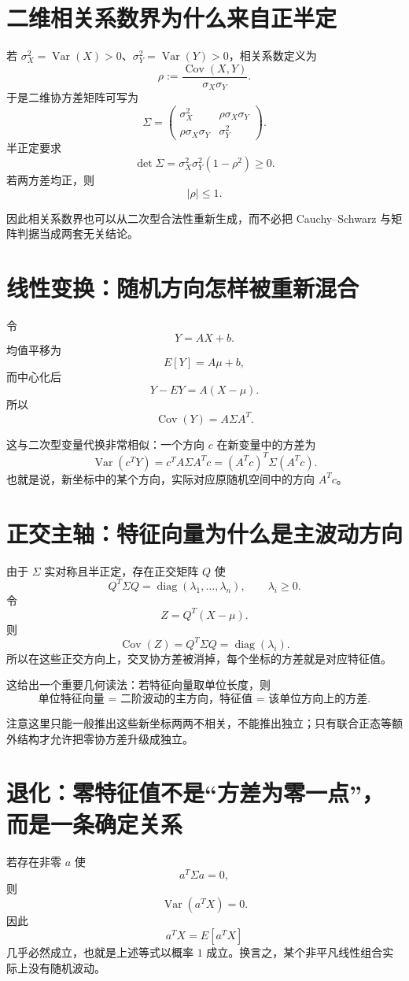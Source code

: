 \documentclass[profile=standard]{ipara-handbook}
\begin{document}
\section{二维相关系数界为什么来自正半定}
若 $\sigma_X^2=\operatorname{Var}(X)>0$、$\sigma_Y^2=\operatorname{Var}(Y)>0$，相关系数定义为
\[
\rho:=\frac{\operatorname{Cov}(X,Y)}{\sigma_X\sigma_Y}.
\]
于是二维协方差矩阵可写为
\[
\Sigma=
\begin{pmatrix}
\sigma_X^2&\rho\sigma_X\sigma_Y\\
\rho\sigma_X\sigma_Y&\sigma_Y^2
\end{pmatrix}.
\]
半正定要求
\[
\det\Sigma
=\sigma_X^2\sigma_Y^2(1-\rho^2)\ge0.
\]
若两方差均正，则
\[
\boxed{\lvert\rho\rvert\le1.}
\]

因此相关系数界也可以从二次型合法性重新生成，而不必把 Cauchy--Schwarz 与矩阵判据当成两套无关结论。

\section{线性变换：随机方向怎样被重新混合}
令
\[
Y=AX+b.
\]
均值平移为
\[
E[Y]=A\mu+b,
\]
而中心化后
\[
Y-EY=A(X-\mu).
\]
所以
\[
\boxed{
\operatorname{Cov}(Y)
=A\Sigma A^T.
}
\]

这与二次型变量代换非常相似：一个方向 $c$ 在新变量中的方差为
\[
\operatorname{Var}(c^TY)
=c^TA\Sigma A^Tc
=(A^Tc)^T\Sigma(A^Tc).
\]
也就是说，新坐标中的某个方向，实际对应原随机空间中的方向 $A^Tc$。

\section{正交主轴：特征向量为什么是主波动方向}
由于 $\Sigma$ 实对称且半正定，存在正交矩阵 $Q$ 使
\[
Q^T\Sigma Q
=\operatorname{diag}(\lambda_1,\dots,\lambda_n),
\qquad \lambda_i\ge0.
\]
令
\[
Z=Q^T(X-\mu).
\]
则
\[
\operatorname{Cov}(Z)
=Q^T\Sigma Q
=\operatorname{diag}(\lambda_i).
\]
所以在这些正交方向上，交叉协方差被消掉，每个坐标的方差就是对应特征值。

这给出一个重要几何读法：若特征向量取单位长度，则
\[
\boxed{\text{单位特征向量 = 二阶波动的主方向，特征值 = 该单位方向上的方差}.}
\]

注意这里只能一般推出这些新坐标两两不相关，不能推出独立；只有联合正态等额外结构才允许把零协方差升级成独立。

\section{退化：零特征值不是“方差为零一点”，而是一条确定关系}
若存在非零 $a$ 使
\[
a^T\Sigma a=0,
\]
则
\[
\operatorname{Var}(a^TX)=0.
\]
因此
\[
a^TX=E[a^TX]
\]
几乎必然成立，也就是上述等式以概率 $1$ 成立。换言之，某个非平凡线性组合实际上没有随机波动。
\end{document}

